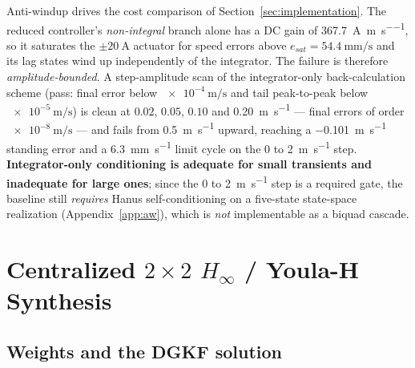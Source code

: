 \documentclass[energies,article,submit,pdftex,oneauthor]{Definitions/mdpi}
\begin{document}
Anti-windup drives the cost comparison of
Section~\ref{sec:implementation}. The reduced controller's \emph{non-integral} branch alone has a
DC gain of \SI{367.7}{\ampere\per\meter\per\second}, so it saturates the $\pm\SI{20}{\ampere}$
actuator for speed errors above $e_{sat} = \SI{54.4}{\milli\meter\per\second}$ and its lag states
wind up independently of the integrator. The failure is therefore \emph{amplitude-bounded}. A step-amplitude scan of
the integrator-only back-calculation scheme (pass: final error below
$\SI{e-4}{\meter\per\second}$ and tail peak-to-peak below $\SI{e-5}{\meter\per\second}$) is clean
at $0.02$, $0.05$, $0.10$ and \SI{0.20}{\meter\per\second} --- final errors of order
$\SI{e-8}{\meter\per\second}$ --- and fails from \SI{0.5}{\meter\per\second} upward, reaching a
\SI{-0.101}{\meter\per\second} standing error and a \SI{6.3}{\milli\meter\per\second} limit cycle
on the 0 to \SI{2}{\meter\per\second} step. \textbf{Integrator-only conditioning is adequate for
small transients and inadequate for large ones}; since the 0 to \SI{2}{\meter\per\second} step is
a required gate, the baseline still \emph{requires} Hanus
self-conditioning \citep{hanus1987conditioning} on a five-state state-space realization
(Appendix~\ref{app:aw}), which is \emph{not} implementable as a biquad cascade.

\section{Centralized $2\times2$ $H_\infty$ / Youla-H Synthesis}
\label{sec:mimo}

\subsection{Weights and the DGKF solution}
\end{document}
